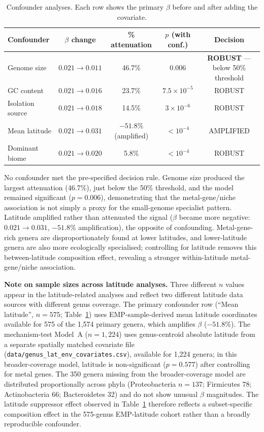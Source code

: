 \documentclass[times]{zHenriquesLab-StyleBioRxiv}
\begin{document}
\begin{table}[htbp]
\caption{Confounder analyses. Each row shows the primary $\beta$ before and
after adding the covariate.}
\label{tab:7}
\centering
\small
\begin{tabular}{lcccc}
\toprule
Confounder & $\beta$ change & \% attenuation & $p$ (with conf.) & Decision \\
\midrule
Genome size & $0.021 \to 0.011$ & 46.7\% & 0.006
  & \textbf{ROBUST} --- below 50\% threshold \\
GC content & $0.021 \to 0.016$ & 23.7\% & $7.5 \times 10^{-5}$
  & ROBUST \\
Isolation source & $0.021 \to 0.018$ & 14.5\% & $3 \times 10^{-6}$
  & ROBUST \\
Mean latitude & $0.021 \to 0.031$ & $-51.8\%$ (amplified) & $<10^{-4}$
  & AMPLIFIED \\
Dominant biome & $0.021 \to 0.020$ & 5.8\% & $<10^{-4}$
  & ROBUST \\
\bottomrule
\end{tabular}
\end{table}

No confounder met the pre-specified decision rule. Genome size produced the
largest attenuation (46.7\%), just below the 50\% threshold, and the model
remained significant ($p = 0.006$), demonstrating that the metal-gene/niche
association is not simply a proxy for the small-genome specialist pattern.
Latitude amplified rather than attenuated the signal ($\beta$ became more
negative: $0.021 \to 0.031$, $-51.8\%$ amplification), the opposite of
confounding. Metal-gene-rich genera are disproportionately found at lower
latitudes, and lower-latitude genera are also more ecologically specialised;
controlling for latitude removes this between-latitude composition effect,
revealing a stronger within-latitude metal-gene/niche association.

\textbf{Note on sample sizes across latitude analyses.} Three different $n$
values appear in the latitude-related analyses and reflect two different
latitude data sources with different genus coverage. The primary confounder
row (``Mean latitude'', $n = 575$; Table~\ref{tab:7}) uses EMP-sample-derived
mean latitude coordinates available for 575 of the 1,574 primary genera, which
amplifies $\beta$ ($-51.8\%$). The mechanism-test Model~A ($n = 1{,}224$) uses
genus-centroid absolute latitude from a separate spatially matched covariate
file (\texttt{data/genus\_lat\_env\_covariates.csv}), available for 1,224 genera;
in this broader-coverage model, latitude is non-significant ($p = 0.577$) after
controlling for metal genes. The 350 genera missing from the broader-coverage
model are distributed proportionally across phyla (Proteobacteria $n = 137$;
Firmicutes 78; Actinobacteria 66; Bacteroidetes 32) and do not show unusual
$\beta$ magnitudes. The latitude suppressor effect observed in Table~\ref{tab:7}
therefore reflects a subset-specific composition effect in the 575-genus
EMP-latitude cohort rather than a broadly reproducible confounder.
\end{document}
